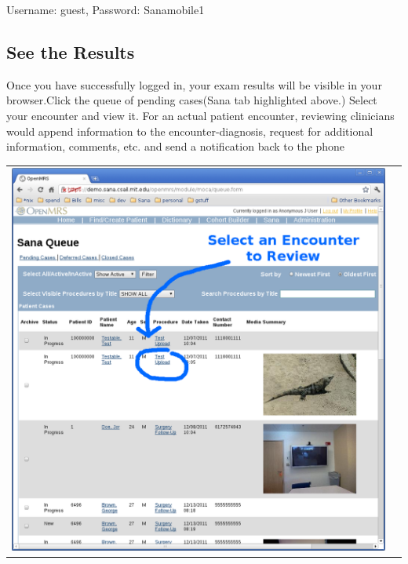 \documentclass[a4paper,10pt]{article}
\begin{document}
Username: guest, Password: Sanamobile1

\subsection{See the Results}
\noindent Once you have successfully logged in, your exam results will be 
visible in your browser.Click the queue of pending cases(Sana tab highlighted 
above.) Select your encounter and view it. For an actual patient encounter, 
reviewing clinicians would append information to the encounter-diagnosis, 
request for additional information, comments, etc. and send a notification 
back to the phone

\begin{flushleft}
\begin{tabular}{ c c }
\includegraphics[scale=0.25,keepaspectratio=true]{openmrs_sana_queue.png}

\end{tabular}
\end{flushleft}
\end{document}
